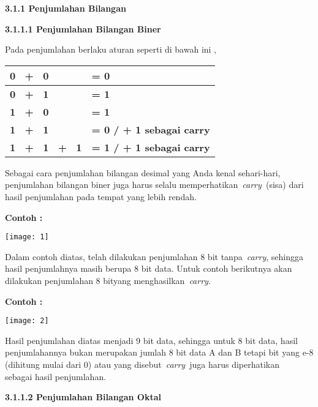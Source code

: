 \documentclass[11pt,fleqn]{book} %
\begin{document}
\noindent \textbf{3.1.1 Penjumlahan Bilangan}

\noindent \textbf{3.1.1.1 Penjumlahan Bilangan Biner}

Pada penjumlahan berlaku aturan seperti di bawah ini ,

\begin{center}
\begin{tabular}{|p{0.9in}|p{1.3in}|} \hline 
\textbf{0~ +~ 0} & \textbf{= 0} \\ \hline 
\textbf{0~ +~ 1} & \textbf{= 1} \\ \hline 
\textbf{1~ +~ 0} & \textbf{= 1} \\ \hline 
\textbf{1~ +~ 1} & \textbf{= 0 / + 1 sebagai carry} \\ \hline 
\textbf{1~ +~ 1~ +~ 1} & \textbf{= 1 / + 1 sebagai carry} \\ \hline 
\end{tabular}
\end{center}

Sebagai cara penjumlahan bilangan desimal yang Anda kenal sehari-hari, penjumlahan bilangan biner juga harus selalu memperhatikan~\textit{carry~}(sisa) dari hasil penjumlahan pada tempat yang lebih rendah.

\noindent \textbf{Contoh :}

\begin{center}
\noindent \texttt{[image: 1]}
\end{center}
\noindent 

\noindent Dalam contoh diatas, telah dilakukan penjumlahan 8 bit tanpa~\textit{carry}, sehingga hasil penjumlahnya masih berupa 8 bit data. Untuk contoh berikutnya akan dilakukan penjumlahan 8 bityang menghasilkan~\textit{carry}.

\noindent \textbf{Contoh :}

\begin{center}
\noindent \texttt{[image: 2]}
\end{center}

\noindent 

\noindent Hasil penjumlahan diatas menjadi 9 bit data, sehingga untuk 8 bit data, hasil penjumlahannya bukan merupakan jumlah 8 bit data A dan B tetapi bit yang e-8 (dihitung mulai dari 0) atau yang disebut~\textit{carry}~juga harus diperhatikan~ sebagai hasil penjumlahan.

\noindent \textbf{3.1.1.2 Penjumlahan Bilangan Oktal}
\end{document}
